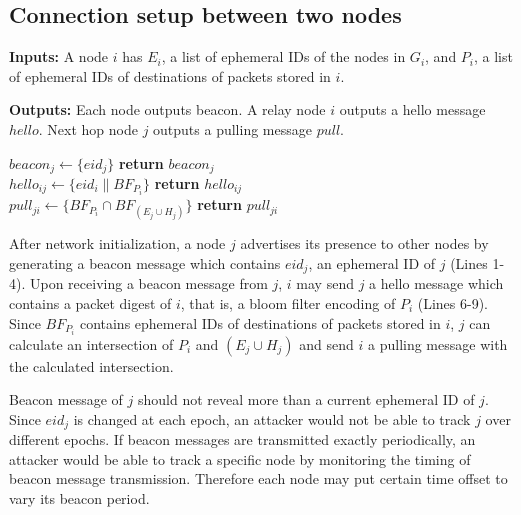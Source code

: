\documentclass[11pt]{article}
\begin{document}
\subsection{Connection setup between two nodes}

\begin{framed}
\noindent
\textbf{Inputs:} A node $i$ has $E_i$, a list of ephemeral IDs of the nodes in $G_i$, and $P_i$, a list of ephemeral IDs of destinations of packets stored in $i$.

\noindent
\textbf{Outputs:} Each node outputs beacon. A relay node $i$ outputs a hello message $hello$. 
Next hop node $j$ outputs a pulling message $pull$.

\begin{algorithmic}[1]
    \State $beacon_j \leftarrow \{ eid_j \}$         
    \State \textbf{return} $beacon_j$
  \EndProcedure\\
  
    \State $hello_{ij} \leftarrow \{ eid_i \| BF_{P_i} \}$         
    \State \textbf{return} $hello_{ij}$
  \EndProcedure\\

    \State $pull_{ji} \leftarrow \{ BF_{P_i} \cap BF_{(E_j \cup H_j)} \}$         
    \State \textbf{return} $pull_{ji}$
  \EndProcedure  
\end{algorithmic}
\end{framed}


After network initialization, a node $j$ advertises its presence to other nodes by generating a beacon message which contains $eid_j$, an ephemeral ID of $j$ (Lines 1-4).
Upon receiving a beacon message from $j$, $i$ may send $j$ a hello message which contains a packet digest of $i$, that is, a bloom filter encoding of $P_i$ (Lines 6-9). 
Since $BF_{P_i}$ contains ephemeral IDs of destinations of packets stored in $i$, $j$ can calculate an intersection of $P_i$ and $(E_j \cup H_j)$ and send $i$ a pulling message with the calculated intersection.


Beacon message of $j$ should not reveal more than a current ephemeral ID of $j$. 
Since $eid_j$ is changed at each epoch, an attacker would not be able to track $j$ over different epochs. 
If beacon messages are transmitted exactly periodically, an attacker would be able to track a specific node by monitoring the timing of beacon message transmission. 
Therefore each node may put certain time offset to vary its beacon period.
\end{document}
